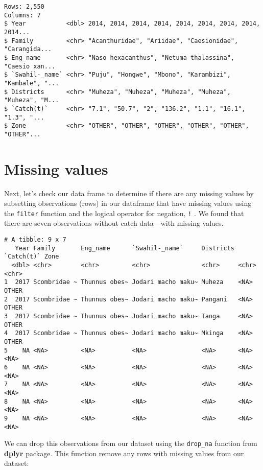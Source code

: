 \documentclass[
  12pt,
  a4paper,
  oneside]{book}
\begin{document}
\begin{verbatim}
Rows: 2,550
Columns: 7
$ Year           <dbl> 2014, 2014, 2014, 2014, 2014, 2014, 2014, 2014, 2014...
$ Family         <chr> "Acanthuridae", "Ariidae", "Caesionidae", "Carangida...
$ Eng_name       <chr> "Naso hexacanthus", "Netuma thalassina", "Caesio xan...
$ `Swahil-_name` <chr> "Puju", "Hongwe", "Mbono", "Karambizi", "Kambale", "...
$ Districts      <chr> "Muheza", "Muheza", "Muheza", "Muheza", "Muheza", "M...
$ `Catch(t)`     <chr> "7.1", "50.7", "2", "136.2", "1.1", "16.1", "1.3", "...
$ Zone           <chr> "OTHER", "OTHER", "OTHER", "OTHER", "OTHER", "OTHER"...
\end{verbatim}

\hypertarget{missing-values}{%
\section{Missing values}\label{missing-values}}

Next, let's check our data frame to determine if there are any missing values by subsetting observations (rows) in our dataframe that have missing values using the \texttt{filter} function and the logical operator for negation, \texttt{!} . We found that there are seven observations without catch data---with missing values.

\begin{verbatim}
# A tibble: 9 x 7
   Year Family       Eng_name      `Swahil-_name`     Districts `Catch(t)` Zone 
  <dbl> <chr>        <chr>         <chr>              <chr>     <chr>      <chr>
1  2017 Scombridae ~ Thunnus obes~ Jodari macho maku~ Muheza    <NA>       OTHER
2  2017 Scombridae ~ Thunnus obes~ Jodari macho maku~ Pangani   <NA>       OTHER
3  2017 Scombridae ~ Thunnus obes~ Jodari macho maku~ Tanga     <NA>       OTHER
4  2017 Scombridae ~ Thunnus obes~ Jodari macho maku~ Mkinga    <NA>       OTHER
5    NA <NA>         <NA>          <NA>               <NA>      <NA>       <NA> 
6    NA <NA>         <NA>          <NA>               <NA>      <NA>       <NA> 
7    NA <NA>         <NA>          <NA>               <NA>      <NA>       <NA> 
8    NA <NA>         <NA>          <NA>               <NA>      <NA>       <NA> 
9    NA <NA>         <NA>          <NA>               <NA>      <NA>       <NA> 
\end{verbatim}

We can drop this observations from our dataset using the \texttt{drop\_na} function from \textbf{dplyr} package. This function remove any rows with missing values from our dataset:
\end{document}
